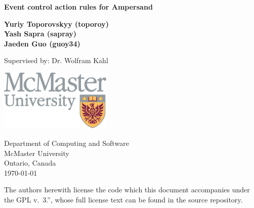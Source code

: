 \begin{titlepage}
    \begin{center}
        \vspace*{1cm}
        
        \textbf{ Event control action rules for Ampersand}
        
             
        \vspace{1.5cm}
        
        \textbf{Yuriy Toporovskyy (toporoy)\\ Yash Sapra (sapray) \\ Jaeden Guo 
    (guoy34)}
        
        \vfill
        
        Supervised by: Dr. Wolfram Kahl
        
        \vspace{0.8cm}
        
        \includegraphics[width=0.4\textwidth]{../figures/mac_logo.jpg}
        
        Department of Computing and Software\\
        McMaster University\\
        Ontario, Canada\\
        \today
 
        \vfill 

        The authors herewith license the code which this document accompanies under the GPL v.~3.'', 
        whose full license text can be found in the source repository. 

    \end{center}
\end{titlepage}
